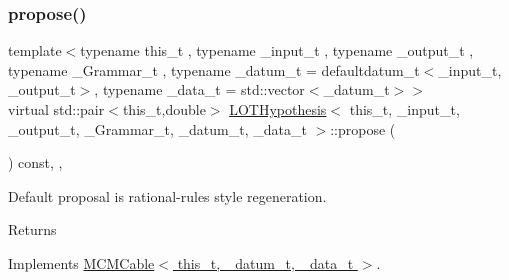 \mbox{\label{class_l_o_t_hypothesis_a0b1aac85e8c09fbdf438e6bf443951b7}} 
\subsubsection{\texorpdfstring{propose()}{propose()}}
{\footnotesize\ttfamily template$<$typename this\+\_\+t , typename \+\_\+input\+\_\+t , typename \+\_\+output\+\_\+t , typename \+\_\+\+Grammar\+\_\+t , typename \+\_\+datum\+\_\+t  = defaultdatum\+\_\+t$<$\+\_\+input\+\_\+t, \+\_\+output\+\_\+t$>$, typename \+\_\+data\+\_\+t  = std\+::vector$<$\+\_\+datum\+\_\+t$>$$>$ \\
virtual std\+::pair$<$this\+\_\+t,double$>$ \hyperlink{class_l_o_t_hypothesis}{L\+O\+T\+Hypothesis}$<$ this\+\_\+t, \+\_\+input\+\_\+t, \+\_\+output\+\_\+t, \+\_\+\+Grammar\+\_\+t, \+\_\+datum\+\_\+t, \+\_\+data\+\_\+t $>$\+::propose (\begin{DoxyParamCaption}{ }\end{DoxyParamCaption}) const\hspace{0.3cm}{\ttfamily [inline]}, {\ttfamily [override]}, {\ttfamily [virtual]}}

Default proposal is rational-\/rules style regeneration. \begin{DoxyReturn}{Returns}

\end{DoxyReturn}


Implements \hyperlink{class_m_c_m_cable_a98b52f1867ea0d72c1c91b4496d756d2}{M\+C\+M\+Cable$<$ this\+\_\+t, \+\_\+datum\+\_\+t, \+\_\+data\+\_\+t $>$}.

\mbox{\label{class_l_o_t_hypothesis_aef932da4e5ab819282ee59e17e65491f}} 
